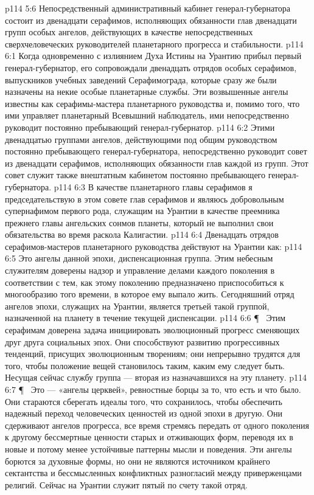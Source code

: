 \vs p114 5:6 Непосредственный административный кабинет генерал\hyp{}губернатора состоит из двенадцати серафимов, исполняющих обязанности глав двенадцати групп особых ангелов, действующих в качестве непосредственных сверхчеловеческих руководителей планетарного прогресса и стабильности.
\vs p114 6:1 Когда одновременно с излиянием Духа Истины на Урантию прибыл первый генерал\hyp{}губернатор, его сопровождали двенадцать отрядов особых серафимов, выпускников учебных заведений Серафимограда, которые сразу же были назначены на некие особые планетарные службы. Эти возвышенные ангелы известны как серафимы\hyp{}мастера планетарного руководства и, помимо того, что ими управляет планетарный Всевышний наблюдатель, ими непосредственно руководит постоянно пребывающий генерал\hyp{}губернатор.
\vs p114 6:2 Этими двенадцатью группами ангелов, действующими под общим руководством постоянно пребывающего генерал\hyp{}губернатора, непосредственно руководит совет из двенадцати серафимов, исполняющих обязанности глав каждой из групп. Этот совет служит также внештатным кабинетом постоянно пребывающего генерал\hyp{}губернатора.
\vs p114 6:3 В качестве планетарного главы серафимов я председательствую в этом совете глав серафимов и являюсь добровольным супернафимом первого рода, служащим на Урантии в качестве преемника прежнего главы ангельских сонмов планеты, который не выполнил свои обязательства во время раскола Калигастии.
\vs p114 6:4 Двенадцать отрядов серафимов\hyp{}мастеров планетарного руководства действуют на Урантии как:
\vs p114 6:5 \bibnobreakspace {} Это ангелы данной эпохи, диспенсационная группа. Этим небесным служителям доверены надзор и управление делами каждого поколения в соответствии с тем, как этому поколению предназначено приспособиться к многообразию того времени, в которое ему выпало жить. Сегодняшний отряд ангелов эпохи, служащих на Урантии, является третьей такой группой, назначенной на планету в течение текущей диспенсации.
\vs p114 6:6 \P\ \bibnobreakspace {} Этим серафимам доверена задача инициировать эволюционный прогресс сменяющих друг друга социальных эпох. Они способствуют развитию прогрессивных тенденций, присущих эволюционным творениям; они непрерывно трудятся для того, чтобы положение вещей становилось таким, каким ему следует быть. Несущая сейчас службу группа --- вторая из назначавшихся на эту планету.
\vs p114 6:7 \P\ \bibnobreakspace {} Это --- «ангелы церквей», ревностные борцы за то, что есть и что было. Они стараются сберегать идеалы того, что сохранилось, чтобы обеспечить надежный переход человеческих ценностей из одной эпохи в другую. Они сдерживают ангелов прогресса, все время стремясь передать от одного поколения к другому бессмертные ценности старых и отживающих форм, переводя их в новые и потому менее устойчивые паттерны мысли и поведения. Эти ангелы борются за духовные формы, но они не являются источником крайнего сектантства и бессмысленных конфликтных разногласий между приверженцами религий. Сейчас на Урантии служит пятый по счету такой отряд.
